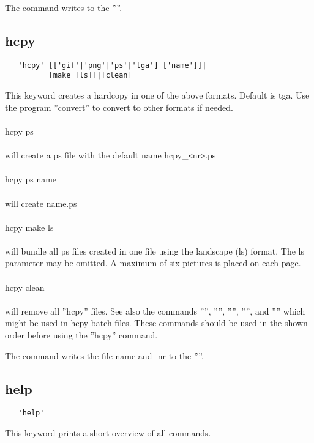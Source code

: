 \documentclass{article}
\begin{document}
The command writes to the ''''.

\subsection{\label{hcpy}hcpy}
\begin{verbatim}
   'hcpy' [['gif'|'png'|'ps'|'tga'] ['name']]|
          [make [ls]]|[clean]
\end{verbatim}
This keyword creates a hardcopy in one of the above formats. Default is tga. Use the program ''convert'' to convert to other formats if needed.\\\\hcpy ps\\\\will create a ps file with the default name hcpy\_\verb_<_nr\verb_>_.ps\\\\hcpy ps name\\\\will create name.ps\\\\hcpy make ls\\\\will bundle all ps files created in one file using the landscape (ls) format. The ls parameter may be omitted. A maximum of six pictures is placed on each page.\\\\hcpy clean\\\\will remove all ''hcpy'' files. See also the commands '''', '''', '''', '''', and '''' which might be used in hcpy batch files. These commands should be used in the shown order before using the ''hcpy'' command.

The command writes the file-name and -nr to the ''''.

\subsection{\label{help}help}
\begin{verbatim}
   'help'
\end{verbatim}
This keyword prints a short overview of all commands.
\end{document}
